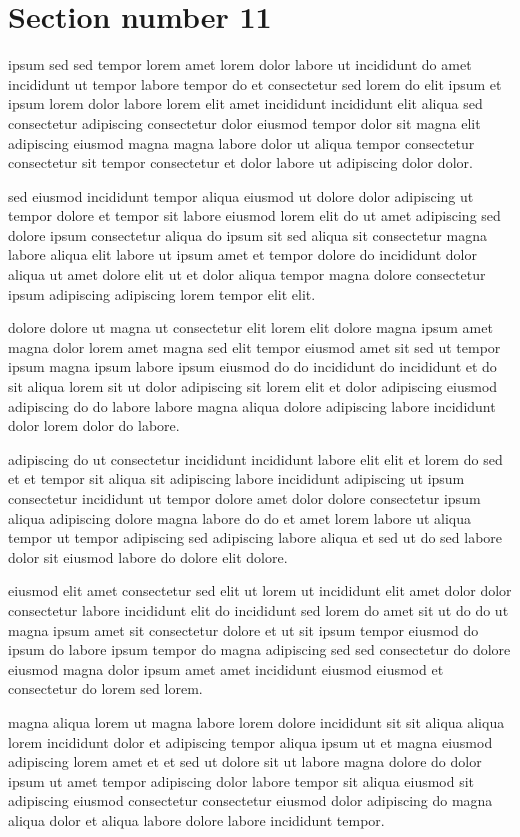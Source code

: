 \documentclass{article}
\begin{document}
\section{Section number 11}\label{sec:11}
ipsum sed sed tempor lorem amet lorem dolor labore ut incididunt do amet incididunt ut tempor labore tempor do et consectetur sed lorem do elit ipsum et ipsum lorem dolor labore lorem elit amet incididunt incididunt elit aliqua sed consectetur adipiscing consectetur dolor eiusmod tempor dolor sit magna elit adipiscing eiusmod magna magna labore dolor ut aliqua tempor consectetur consectetur sit tempor consectetur et dolor labore ut adipiscing dolor dolor.

sed eiusmod incididunt tempor aliqua eiusmod ut dolore dolor adipiscing ut tempor dolore et tempor sit labore eiusmod lorem elit do ut amet adipiscing sed dolore ipsum consectetur aliqua do ipsum sit sed aliqua sit consectetur magna labore aliqua elit labore ut ipsum amet et tempor dolore do incididunt dolor aliqua ut amet dolore elit ut et dolor aliqua tempor magna dolore consectetur ipsum adipiscing adipiscing lorem tempor elit elit.

dolore dolore ut magna ut consectetur elit lorem elit dolore magna ipsum amet magna dolor lorem amet magna sed elit tempor eiusmod amet sit sed ut tempor ipsum magna ipsum labore ipsum eiusmod do do incididunt do incididunt et do sit aliqua lorem sit ut dolor adipiscing sit lorem elit et dolor adipiscing eiusmod adipiscing do do labore labore magna aliqua dolore adipiscing labore incididunt dolor lorem dolor do labore.

adipiscing do ut consectetur incididunt incididunt labore elit elit et lorem do sed et et tempor sit aliqua sit adipiscing labore incididunt adipiscing ut ipsum consectetur incididunt ut tempor dolore amet dolor dolore consectetur ipsum aliqua adipiscing dolore magna labore do do et amet lorem labore ut aliqua tempor ut tempor adipiscing sed adipiscing labore aliqua et sed ut do sed labore dolor sit eiusmod labore do dolore elit dolore.

eiusmod elit amet consectetur sed elit ut lorem ut incididunt elit amet dolor dolor consectetur labore incididunt elit do incididunt sed lorem do amet sit ut do do ut magna ipsum amet sit consectetur dolore et ut sit ipsum tempor eiusmod do ipsum do labore ipsum tempor do magna adipiscing sed sed consectetur do dolore eiusmod magna dolor ipsum amet amet incididunt eiusmod eiusmod et consectetur do lorem sed lorem.

magna aliqua lorem ut magna labore lorem dolore incididunt sit sit aliqua aliqua lorem incididunt dolor et adipiscing tempor aliqua ipsum ut et magna eiusmod adipiscing lorem amet et et sed ut dolore sit ut labore magna dolore do dolor ipsum ut amet tempor adipiscing dolor labore tempor sit aliqua eiusmod sit adipiscing eiusmod consectetur consectetur eiusmod dolor adipiscing do magna aliqua dolor et aliqua labore dolore labore incididunt tempor.
\end{document}
